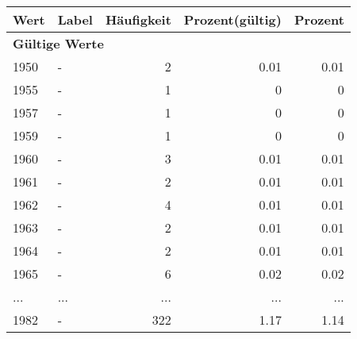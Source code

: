      \begin{longtable}{lXrrr}
     \toprule
     \textbf{Wert} & \textbf{Label} & \textbf{Häufigkeit} & \textbf{Prozent(gültig)} & \textbf{Prozent} \\
     \endhead
     \midrule
     \multicolumn{5}{l}{\textbf{Gültige Werte}}\\
        1950 & \multicolumn{1}{X}{-} & %
          \num{2} &
          \num[round-mode=places,round-precision=2]{0.01} &
          \num[round-mode=places,round-precision=2]{0.01} \\
        1955 & \multicolumn{1}{X}{-} & %
          \num{1} &
          \num[round-mode=places,round-precision=2]{0} &
          \num[round-mode=places,round-precision=2]{0} \\
        1957 & \multicolumn{1}{X}{-} & %
          \num{1} &
          \num[round-mode=places,round-precision=2]{0} &
          \num[round-mode=places,round-precision=2]{0} \\
        1959 & \multicolumn{1}{X}{-} & %
          \num{1} &
          \num[round-mode=places,round-precision=2]{0} &
          \num[round-mode=places,round-precision=2]{0} \\
        1960 & \multicolumn{1}{X}{-} & %
          \num{3} &
          \num[round-mode=places,round-precision=2]{0.01} &
          \num[round-mode=places,round-precision=2]{0.01} \\
        1961 & \multicolumn{1}{X}{-} & %
          \num{2} &
          \num[round-mode=places,round-precision=2]{0.01} &
          \num[round-mode=places,round-precision=2]{0.01} \\
        1962 & \multicolumn{1}{X}{-} & %
          \num{4} &
          \num[round-mode=places,round-precision=2]{0.01} &
          \num[round-mode=places,round-precision=2]{0.01} \\
        1963 & \multicolumn{1}{X}{-} & %
          \num{2} &
          \num[round-mode=places,round-precision=2]{0.01} &
          \num[round-mode=places,round-precision=2]{0.01} \\
        1964 & \multicolumn{1}{X}{-} & %
          \num{2} &
          \num[round-mode=places,round-precision=2]{0.01} &
          \num[round-mode=places,round-precision=2]{0.01} \\
        1965 & \multicolumn{1}{X}{-} & %
          \num{6} &
          \num[round-mode=places,round-precision=2]{0.02} &
          \num[round-mode=places,round-precision=2]{0.02} \\
       ... & ... & ... & ... & ... \\
        1982 & \multicolumn{1}{X}{-} & %
          \num{322} &
          \num[round-mode=places,round-precision=2]{1.17} &
          \num[round-mode=places,round-precision=2]{1.14} \\


\end{longtable}
